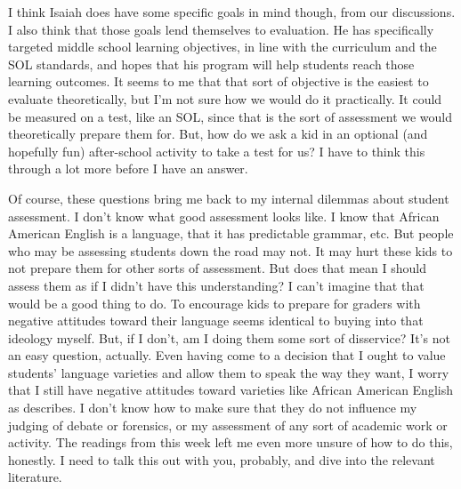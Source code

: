 \documentclass[man,12pt]{apa6}
\begin{document}
I think Isaiah does have some specific goals in mind though, from our
discussions. I also think that those goals lend themselves to evaluation.  He
has specifically targeted middle school learning objectives, in line with the
curriculum and the SOL standards, and hopes that his program will help students
reach those learning outcomes. 
It seems to me that that sort of objective is the easiest to evaluate
theoretically, but I'm not sure how we would do it practically. It could be
measured on a test, like an SOL, since that is the sort of assessment we would
theoretically prepare them for. But, how do we ask a kid in an optional (and
hopefully fun) after-school activity to take a test for us? 
I have to think this through a lot more before I have an answer.

Of course, these questions bring me back to my internal dilemmas about student
assessment. I don't know what good assessment looks like. I know that African
American English is a language, that it has predictable grammar, etc. But
people who may be assessing students down the road may not. It may hurt these
kids to not prepare them for other sorts of assessment. 
But does that mean I should assess them as if I didn't have this understanding?
I can't imagine that that would be a good thing to do.  To encourage kids to
prepare for graders with negative attitudes toward their language seems
identical to buying into that ideology myself. But, if I don't, am I doing them
some sort of disservice? It's not an easy question, actually. 
Even having come to a decision that I ought to value students' language
varieties and allow them to speak the way they want, I worry that I still have
negative attitudes toward varieties like African American English as
\citet{Lippi-Green11} describes. I don't know how to make sure that they do not
influence my judging of debate or forensics, or my assessment of any sort of
academic work or activity. The readings from this week left me even more unsure
of how to do this, honestly. I need to talk this out with you, probably, and
dive into the relevant literature. 

\nocite{CharityHudley10}

\clearpage



\end{document}
